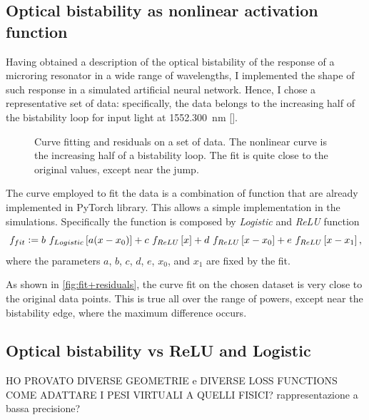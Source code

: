 \subsection{Optical bistability as nonlinear activation function}
\label{ssec:Optical_bistability_as_nonlinear_activation_function}
Having obtained a description of the optical bistability of the response of a microring resonator in a wide range of wavelengths, I implemented the shape of such response in a simulated artificial neural network.
Hence, I chose a representative set of data:
specifically, the data belongs to the increasing half of the bistability loop for input light at \SI{1552.300}{\nm} \ref{}.

\begin{figure}[htbp]
	\centering
	
	\caption{Curve fitting and residuals on a set of data.
	The nonlinear curve is the increasing half of a bistability loop.
	The fit is quite close to the original values, except near the jump.}
	\label{fig:fit+residuals}
\end{figure}

The curve employed to fit the data is a combination of function that are already implemented in PyTorch library.
This allows a simple implementation in the simulations.
Specifically the function is composed by \textit{Logistic} and \textit{ReLU} function
\begin{equation}
	f_{fit} \vcentcolon= b~f_{Logistic}\left[a(x-x_0)\right] + c~f_{ReLU}\left[x\right]+d~f_{ReLU}\left[x-x_0\right]+e~f_{ReLU}\left[x-x_1\right],
	\label{eq:fit}
\end{equation}
where the parameters $a$, $b$, $c$, $d$, $e$, $x_0$, and $x_1$ are fixed by the fit.

As shown in \autoref{fig:fit+residuals}, the curve fit on the chosen dataset is very close to the original data points.
This is true all over the range of powers, except near the bistability edge, where the maximum difference occurs.

\subsection{Optical bistability vs ReLU and Logistic}
\label{ssec:OBvsReLUvsSIGM}
HO PROVATO DIVERSE GEOMETRIE e DIVERSE LOSS FUNCTIONS\\
COME ADATTARE I PESI VIRTUALI A QUELLI FISICI? rappresentazione a bassa precisione?


